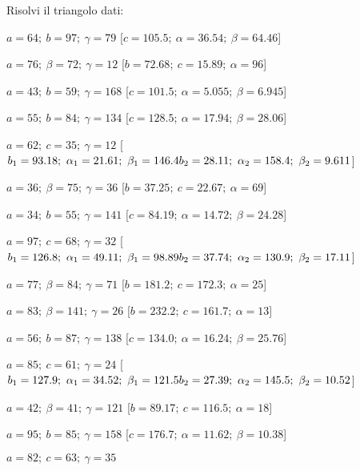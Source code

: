 
\begin{esercizio}\label{ese:}
 Risolvi il triangolo dati:
 \begin{enumeratea}
  \item  \(a=64;~b=97;~\gamma=79\)
   \hfill [\(c=105.5;~\alpha=36.54;~\beta=64.46\)]
  \item  \(a=76;~\beta=72;~\gamma=12\)
   \hfill [\(b=72.68;~c=15.89;~\alpha=96\)]
  \item  \(a=43;~b=59;~\gamma=168\)
   \hfill [\(c=101.5;~\alpha=5.055;~\beta=6.945\)]
  \item  \(a=55;~b=84;~\gamma=134\)
   \hfill [\(c=128.5;~\alpha=17.94;~\beta=28.06\)]
  \item  \(a=62;~c=35;~\gamma=12\)
   \hfill [\(b_1=93.18;~\alpha_1=21.61;~\beta_1=146.4 \\
   {} \hfill          b_2=28.11;~\alpha_2=158.4;~\beta_2=9.611\)]
  \item  \(a=36;~\beta=75;~\gamma=36\)
   \hfill [\(b=37.25;~c=22.67;~\alpha=69\)]
  \item  \(a=34;~b=55;~\gamma=141\)
   \hfill [\(c=84.19;~\alpha=14.72;~\beta=24.28\)]
  \item  \(a=97;~c=68;~\gamma=32\)
   \hfill [\(b_1=126.8;~\alpha_1=49.11;~\beta_1=98.89 \\
   {} \hfill          b_2=37.74;~\alpha_2=130.9;~\beta_2=17.11\)]
  \item  \(a=77;~\beta=84;~\gamma=71\)
   \hfill [\(b=181.2;~c=172.3;~\alpha=25\)]
  \item  \(a=83;~\beta=141;~\gamma=26\)
   \hfill [\(b=232.2;~c=161.7;~\alpha=13\)]
  \item  \(a=56;~b=87;~\gamma=138\)
   \hfill [\(c=134.0;~\alpha=16.24;~\beta=25.76\)]
  \item  \(a=85;~c=61;~\gamma=24\)
   \hfill [\(b_1=127.9;~\alpha_1=34.52;~\beta_1=121.5 \\
   {} \hfill          b_2=27.39;~\alpha_2=145.5;~\beta_2=10.52\)]
  \item  \(a=42;~\beta=41;~\gamma=121\)
   \hfill [\(b=89.17;~c=116.5;~\alpha=18\)]
  \item  \(a=95;~b=85;~\gamma=158\)
   \hfill [\(c=176.7;~\alpha=11.62;~\beta=10.38\)]
  \item  \(a=82;~c=63;~\gamma=35\)

\end{enumeratea}
\end{esercizio}
